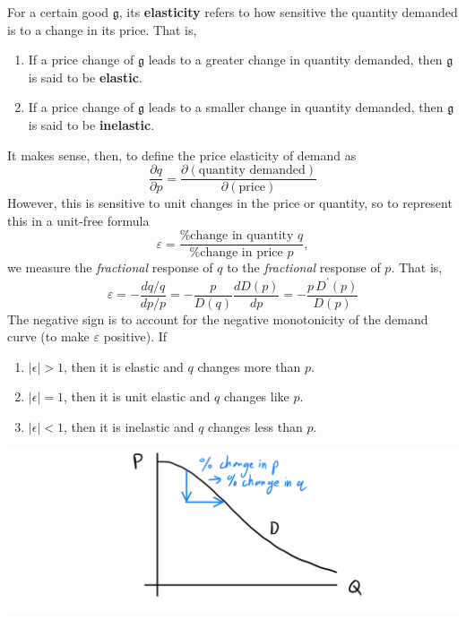 \documentclass{article}
\begin{document}
    \begin{definition}
      For a certain good $\mathfrak{g}$, its \textbf{elasticity} refers to how sensitive the quantity demanded is to a change in its price. That is, 
      \begin{enumerate}
        \item If a price change of $\mathfrak{g}$ leads to a greater change in quantity demanded, then $\mathfrak{g}$ is said to be \textbf{elastic}. 
        \item If a price change of $\mathfrak{g}$ leads to a smaller change in quantity demanded, then $\mathfrak{g}$ is said to be \textbf{inelastic}. 
      \end{enumerate}
      It makes sense, then, to define the price elasticity of demand as 
      \[\frac{\partial q}{\partial p} = \frac{\partial (\text{quantity demanded})}{\partial (\text{price})}\]
      However, this is sensitive to unit changes in the price or quantity, so to represent this in a unit-free formula
      \[\varepsilon = \frac{\text{\% change in quantity } q}{\text{\% change in price } p},\]
      we measure the \textit{fractional} response of $q$ to the \textit{fractional} response of $p$. That is, 
      \[\varepsilon = - \frac{d q / q}{d p / p} = - \frac{p}{D(q)} \frac{d D(p)}{dp} = - \frac{p \, D^\prime (p)}{D(p)}\]
      The negative sign is to account for the negative monotonicity of the demand curve (to make $\varepsilon$ positive). If
      \begin{enumerate}
        \item $|\epsilon| > 1$, then it is elastic and $q$ changes more than $p$. 
        \item $|\epsilon| = 1$, then it is unit elastic and $q$ changes like $p$. 
        \item $|\epsilon| < 1$, then it is inelastic and $q$ changes less than $p$. 
      \end{enumerate}
      \begin{center}
        \includegraphics[scale=0.25]{img/Elasticity_Definition.PNG}
      \end{center}
    \end{definition}
\end{document}
